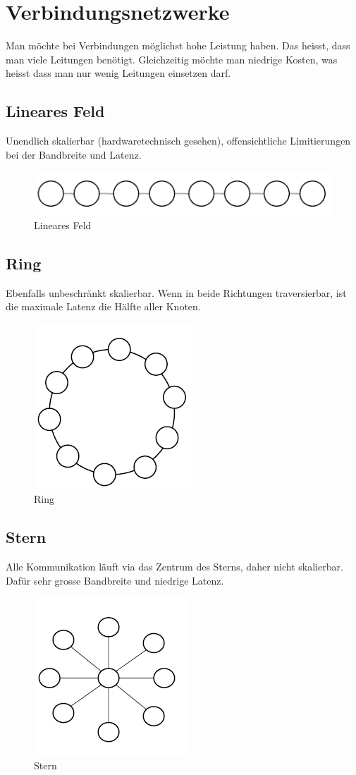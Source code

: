 \section{Verbindungsnetzwerke}
Man möchte bei Verbindungen möglichst hohe Leistung haben. Das heisst, dass man viele Leitungen benötigt. Gleichzeitig möchte man niedrige Kosten, was heisst dass man nur wenig Leitungen einsetzen darf.

\subsection{Lineares Feld}
Unendlich skalierbar (hardwaretechnisch gesehen), offensichtliche Limitierungen bei der Bandbreite und Latenz.

\begin{figure}[h!]
	\centering
	\includegraphics[width=0.7\linewidth]{fig/lineares_feld}
	\caption{Lineares Feld}
	\label{fig:lineares_feld}
\end{figure}

\subsection{Ring}
Ebenfalls unbeschränkt skalierbar. Wenn in beide Richtungen traversierbar, ist die maximale Latenz die Hälfte aller Knoten.

\begin{figure}[h!]
	\centering
	\includegraphics[width=0.2\linewidth]{fig/ring}
	\caption{Ring}
	\label{fig:ring}
\end{figure}

\subsection{Stern}
Alle Kommunikation läuft via das Zentrum des Sterns, daher nicht skalierbar. Dafür sehr grosse Bandbreite und niedrige Latenz.

 \begin{figure}[h!]
\centering
\includegraphics[width=0.2\linewidth]{fig/stern}
\caption{Stern}
\label{fig:stern}
\end{figure}

